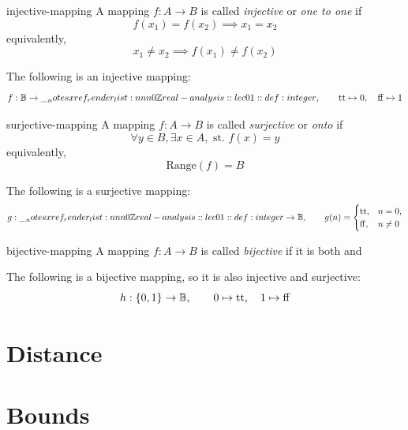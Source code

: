 \documentclass[12pt]{article}
\begin{document}
\begin{dfn}{injective-mapping}
  A mapping \(f: A \to B\) is called \emph{injective} or \emph{one to one} if 
  \[
    f(x_1) = f(x_2) \implies x_1 = x_2
  \] 
  equivalently,
  \[
    x_1 \neq x_2 \implies f(x_1) \neq f(x_2)
  \]
\end{dfn} 

\begin{eg}
  The following is an injective mapping:
  \[
    f:\mathbb B\to\ZZ,\qquad
    \mathrm{tt}\map 0,\quad \mathrm{ff}\map 1
  \]
\end{eg}
  
\begin{dfn}{surjective-mapping}
  A mapping \(f: A \to B\) is called \emph{surjective} or \emph{onto} if 
  \[
    \forall y \in B, \exists x \in A, \text{ st. } f(x) = y
  \] 
  equivalently, 
  \[
    \text{Range}(f) = B 
  \]
\end{dfn} 

\begin{eg}
  The following is a surjective mapping:
  \[
    g:\ZZ\to\mathbb B,\qquad
    g(n)=
    \begin{cases}
      \mathrm{tt}, & n=0,\\
      \mathrm{ff}, & n\neq 0
    \end{cases}
  \]
\end{eg}

\begin{dfn}{bijective-mapping}
  A mapping \(f: A \to B\) is called \emph{bijective} if it is both
   and
\end{dfn} 

\begin{eg}
  The following is a bijective mapping, so it is also injective and surjective:
  \[
    h:\{0,1\}\to\mathbb B,\qquad
    0\mapsto\mathrm{tt},\quad 1\mapsto\mathrm{ff}
  \]
\end{eg}

\section{Distance}


\section{Bounds} 
\end{document}
